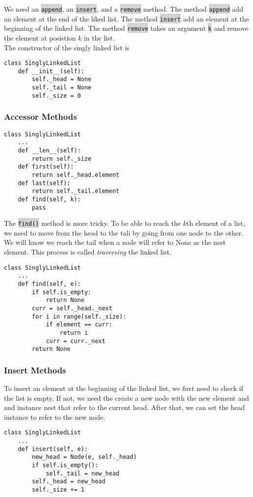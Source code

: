 \documentclass[10pt]{article}
\newcommand{\code}[1]{{\small\colorbox{LightGray}{\texttt{#1}}}}
\begin{document}
We need an \code{append}, an \code{insert}, and a \code{remove} method. The method \code{append} add an element at the end of the liked list. The method \code{insert} add an element at the beginning of the linked list. The method \code{remove} takes an argument \code{k} and remove the element at posistion $k$ in the list.\\ 

The constructor of the singly linked list is
\begin{verbatim}
class SinglyLinkedList
    def __init__(self):
        self._head = None 
        self._tail = None
        self._size = 0
\end{verbatim}

\subsubsection{Accessor Methods}
\begin{verbatim}
class SinglyLinkedList
    ...
    def __len__(self):
        return self._size
    def first(self):
        return self._head.element
    def last(self):
        return self._tail.element
    def find(self, k):
        pass
\end{verbatim}
The \code{find()} method is more tricky. To be able to reach the $k$th element of a list, we need to move from the head to the tali by going from one node to the other. We will know we reach the tail when a node will refer to None as the nest element. This process is called \textit{traversing} the linked list.
\begin{verbatim}
class SinglyLinkedList
    ...
    def find(self, e):
        if self.is_empty: 
            return None
        curr = self._head._next
        for i in range(self._size):
            if element == curr: 
                return i
    		curr = curr._next
        return None
\end{verbatim}

\subsubsection{Insert Methods}
To insert an element at the beginning of the linked list, we first need to check if the list is empty. If not, we need the create a new node with the new element and and instance nest that refer to the current head. After that, we can set the head instance to refer to the new node.
\begin{verbatim}
class SinglyLinkedList
    ...
    def insert(self, e):
        new_head = Node(e, self._head)
        if self.is_empty():
            self._tail = new_head
        self._head = new_head
        self._size += 1
\end{verbatim}
\end{document}
